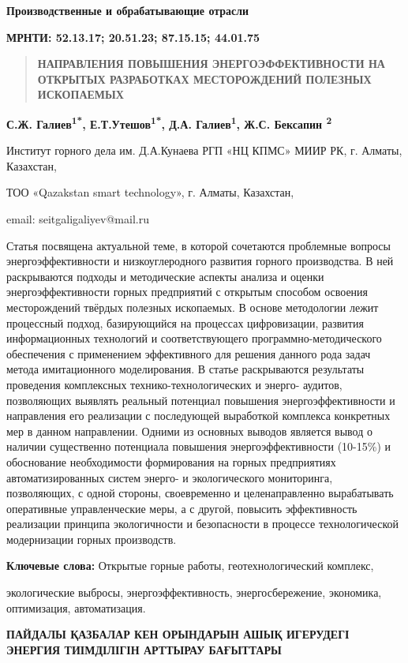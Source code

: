 {\bfseries Производственные и обрабатывающие отрасли}

{\bfseries МРНТИ: 52.13.17; 20.51.23; 87.15.15; 44.01.75}

\begin{quote}
{\bfseries НАПРАВЛЕНИЯ ПОВЫШЕНИЯ ЭНЕРГОЭФФЕКТИВНОСТИ НА ОТКРЫТЫХ
РАЗРАБОТКАХ МЕСТОРОЖДЕНИЙ ПОЛЕЗНЫХ ИСКОПАЕМЫХ}
\end{quote}

{\bfseries С.Ж. Галиев\textsuperscript{1*}, Е.Т.Утешов\textsuperscript{1*},
Д.А. Галиев\textsuperscript{1}, Ж.С. Бексапин \textsuperscript{2}}

Институт горного дела им. Д.А.Кунаева РГП «НЦ КПМС» МИИР РК, г. Алматы,
Казахстан,

ТОО «Qazakstan smart technology», г. Алматы, Казахстан,

email: seitgaligaliyev@mail.ru

Статья посвящена актуальной теме, в которой сочетаются проблемные
вопросы энергоэффективности и низкоуглеродного развития горного
производства. В ней раскрываются подходы и методические аспекты анализа
и оценки энергоэффективности горных предприятий с открытым способом
освоения месторождений твёрдых полезных ископаемых. В основе методологии
лежит процессный подход, базирующийся на процессах цифровизации,
развития информационных технологий и соответствующего
программно-методического обеспечения с применением эффективного для
решения данного рода задач метода имитационного моделирования. В статье
раскрываются результаты проведения комплексных технико-технологических и
энерго- аудитов, позволяющих выявлять реальный потенциал повышения
энергоэффективности и направления его реализации с последующей
выработкой комплекса конкретных мер в данном направлении. Одними из
основных выводов является вывод о наличии существенно потенциала
повышения энергоэффективности (10-15\%) и обоснование необходимости
формирования на горных предприятиях автоматизированных систем энерго- и
экологического мониторинга, позволяющих, с одной стороны, своевременно и
целенаправленно вырабатывать оперативные управленческие меры, а с
другой, повысить эффективность реализации принципа экологичности и
безопасности в процессе технологической модернизации горных производств.

{\bfseries Ключевые слова:} Открытые горные работы, геотехнологический
комплекс,

экологические выбросы, энергоэффективность, энергосбережение, экономика,
оптимизация, автоматизация.

{\bfseries ПАЙДАЛЫ ҚАЗБАЛАР КЕН ОРЫНДАРЫН АШЫҚ ИГЕРУДЕГІ ЭНЕРГИЯ
ТИІМДІЛІГІН АРТТЫРАУ БАҒЫТТАРЫ}

